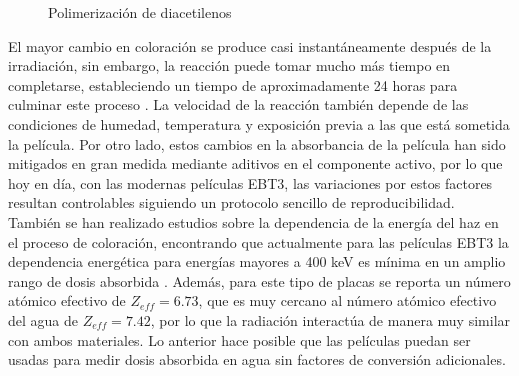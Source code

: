 \begin{figure}[H]
	\centering
	\hfill
	\caption{Polimerización de diacetilenos}
\end{figure}

El mayor cambio en coloración se produce casi instantáneamente después de la irradiación, sin embargo, la reacción puede tomar mucho más tiempo en completarse, estableciendo un tiempo de aproximadamente 24 horas para culminar este proceso \cite{Williams2011}. La velocidad de la reacción también depende de las condiciones de humedad\cite{LenMarroqun2018}, temperatura \cite{Rink2008} y exposición previa a las que está sometida la película\cite{NiroomandRad1998}. Por otro lado, estos cambios en la absorbancia de la película han sido mitigados en gran medida mediante aditivos en el componente activo, por lo que hoy en día, con las modernas películas EBT3, las variaciones por estos factores resultan controlables siguiendo un protocolo sencillo de reproducibilidad. \\

También se han realizado estudios sobre la dependencia de la energía del haz en el proceso de coloración, encontrando que actualmente para las películas EBT3 la dependencia energética para energías mayores a 400 keV es mínima en un amplio rango de dosis absorbida\cite{Chemiski2010} . Además, para este tipo de placas se reporta un número atómico efectivo de $Z_{eff}=6.73$, que es muy cercano al número atómico efectivo del agua de $Z_{eff}=7.42$, por lo que la radiación interactúa de manera muy similar con ambos materiales. Lo anterior hace posible que las películas puedan ser usadas para medir dosis absorbida en agua sin factores de conversión adicionales.\\

